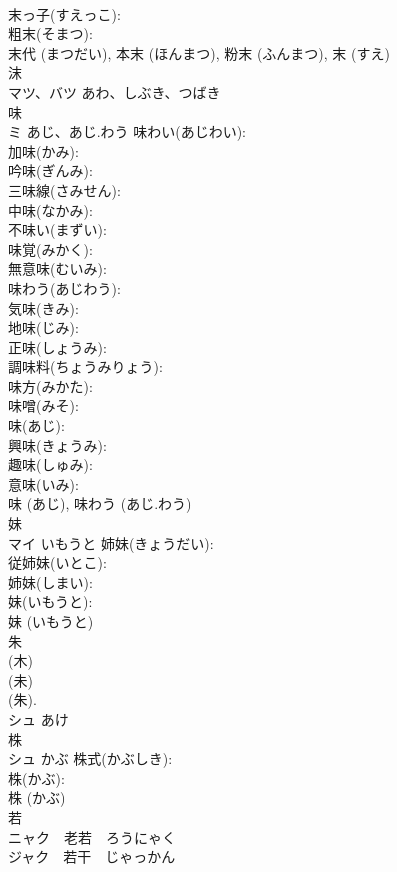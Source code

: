 \documentclass[8pt]{extreport}
\begin{document}
\begin{CJK}{UTF8}{min}
\\	末っ子(すえっこ): 
\\	粗末(そまつ): 
\\	末代 (まつだい), 本末 (ほんまつ), 粉末 (ふんまつ), 末 (すえ)
\\	沫			
\\	マツ、バツ	あわ、しぶき、つばき		
\\	味			
\\	ミ	あじ、あじ.わう	味わい(あじわい): 
\\	加味(かみ): 
\\	吟味(ぎんみ): 
\\	三味線(さみせん): 
\\	中味(なかみ): 
\\	不味い(まずい): 
\\	味覚(みかく): 
\\	無意味(むいみ): 
\\	味わう(あじわう): 
\\	気味(きみ): 
\\	地味(じみ): 
\\	正味(しょうみ): 
\\	調味料(ちょうみりょう): 
\\	味方(みかた): 
\\	味噌(みそ): 
\\	味(あじ): 
\\	興味(きょうみ): 
\\	趣味(しゅみ): 
\\	意味(いみ): 
\\	味 (あじ), 味わう (あじ.わう)
\\	妹			
\\	マイ	いもうと	姉妹(きょうだい): 
\\	従姉妹(いとこ): 
\\	姉妹(しまい): 
\\	妹(いもうと): 
\\	妹 (いもうと)
\\	朱			
\\	(木) 
\\	(未)
\\	(朱).	
\\	シュ	あけ		
\\	株			
\\	シュ	かぶ	株式(かぶしき): 
\\	株(かぶ): 
\\	株 (かぶ)
\\	若			
\\	ニャク　老若　ろうにゃく 
\\	ジャク　若干　じゃっかん

\end{CJK}
\end{document}
